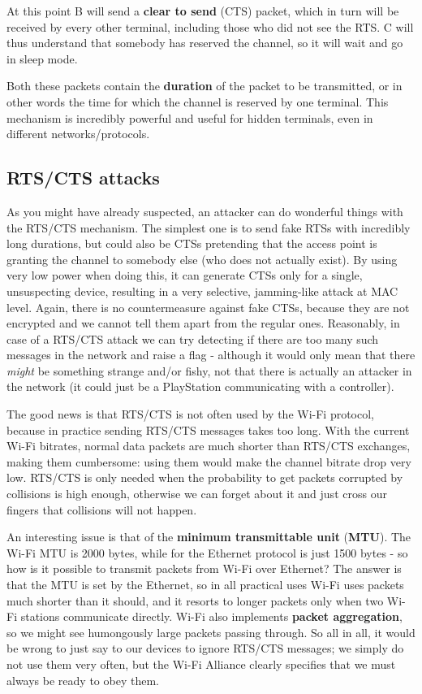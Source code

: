 At this point B will send a \textbf{clear to send} (CTS) packet, which in turn will be received by every other terminal, including those who did not see the RTS. C will thus understand that somebody has reserved the channel, so it will wait and go in sleep mode.

Both these packets contain the \textbf{duration} of the packet to be transmitted, or in other words the time for which the channel is reserved by one terminal. This mechanism is incredibly powerful and useful for hidden terminals, even in different networks/protocols.


\subsection{RTS/CTS attacks}
\label{sec:wifi_rtc_cts_attacks}
As you might have already suspected, an attacker can do wonderful things with the RTS/CTS mechanism. The simplest one is to send fake RTSs with incredibly long durations, but could also be CTSs pretending that the access point is granting the channel to somebody else (who does not actually exist). By using very low power when doing this, it can generate CTSs only for a single, unsuspecting device, resulting in a very selective, jamming-like attack at MAC level. Again, there is no countermeasure against fake CTSs, because they are not encrypted and we cannot tell them apart from the regular ones. Reasonably, in case of a RTS/CTS attack we can try detecting if there are too many such messages in the network and raise a flag - although it would only mean that there \textit{might} be something strange and/or fishy, not that there is actually an attacker in the network (it could just be a PlayStation communicating with a controller).

The good news is that RTS/CTS is not often used by the Wi-Fi protocol, because in practice sending RTS/CTS messages takes too long. With the current Wi-Fi bitrates, normal data packets are much shorter than RTS/CTS exchanges, making them cumbersome: using them would make the channel bitrate drop very low. RTS/CTS is only needed when the probability to get packets corrupted by collisions is high enough, otherwise we can forget about it and just cross our fingers that collisions will not happen.

An interesting issue is that of the \textbf{minimum transmittable unit} (\textbf{MTU}). The Wi-Fi MTU is 2000 bytes, while for the Ethernet protocol is just 1500 bytes - so how is it possible to transmit packets from Wi-Fi over Ethernet? The answer is that the MTU is set by the Ethernet, so in all practical uses Wi-Fi uses packets much shorter than it should, and it resorts to longer packets only when two Wi-Fi stations communicate directly. Wi-Fi also implements \textbf{packet aggregation}, so we might see humongously large packets passing through. So all in all, it would be wrong to just say to our devices to ignore RTS/CTS messages; we simply do not use them very often, but the Wi-Fi Alliance clearly specifies that we must always be ready to obey them.

